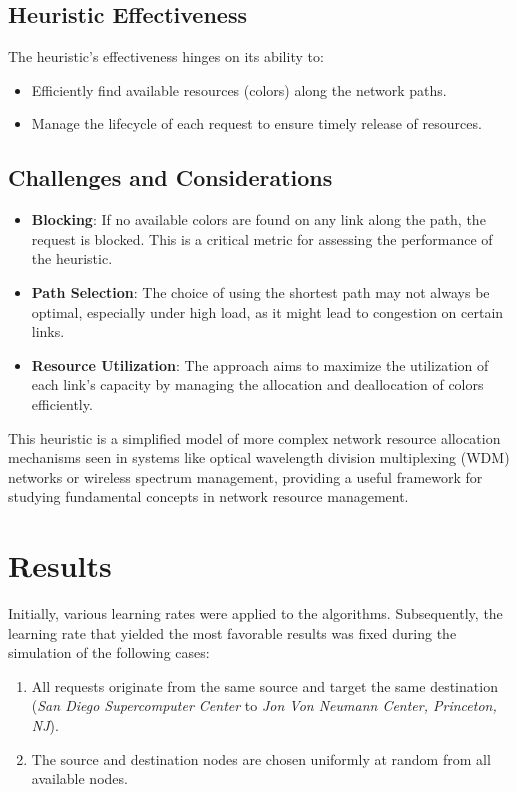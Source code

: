 \documentclass[conference]{IEEEtran}
\begin{document}
\subsection{Heuristic Effectiveness}
The heuristic's effectiveness hinges on its ability to:
\begin{itemize}
    \item Efficiently find available resources (colors) along the network paths.
    \item Manage the lifecycle of each request to ensure timely release of resources.
\end{itemize}

\subsection{Challenges and Considerations}
\begin{itemize}
    \item \textbf{Blocking}: If no available colors are found on any link along the path, the request is blocked. This is a critical metric for assessing the performance of the heuristic.
    \item \textbf{Path Selection}: The choice of using the shortest path may not always be optimal, especially under high load, as it might lead to congestion on certain links.
    \item \textbf{Resource Utilization}: The approach aims to maximize the utilization of each link's capacity by managing the allocation and deallocation of colors efficiently.
\end{itemize}

This heuristic is a simplified model of more complex network resource allocation mechanisms seen in systems like optical wavelength division multiplexing (WDM) networks or wireless spectrum management, providing a useful framework for studying fundamental concepts in network resource management.



\section{Results}

Initially, various learning rates were applied to the algorithms. Subsequently, the learning rate that yielded the most favorable results was fixed during the simulation of the following cases:
\begin{enumerate}[label=\Roman*.]
\item All requests originate from the same source and target the same destination (\textit{San Diego Supercomputer Center} to \textit{Jon Von Neumann Center, Princeton, NJ}).
\item The source and destination nodes are chosen uniformly at random from all available nodes.
\end{enumerate}
\end{document}

